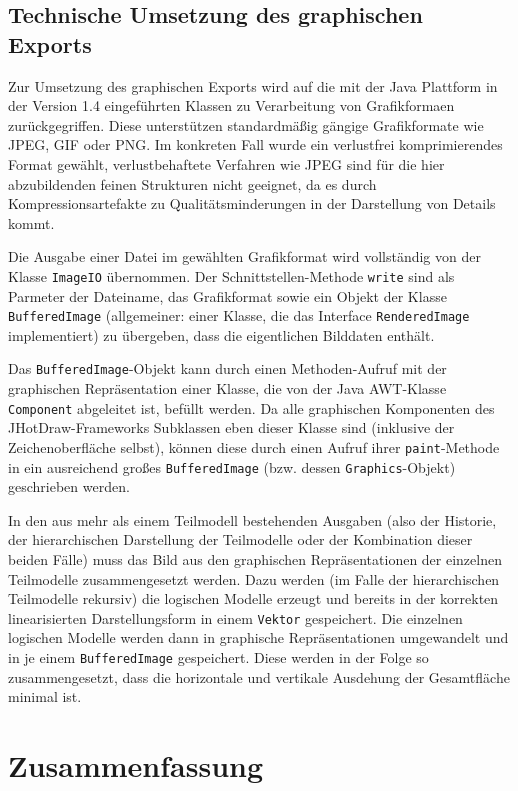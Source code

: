 
\subsection{Technische Umsetzung des graphischen Exports} %
\label{sub:technische_umsetzung_des_graphischen_exports}

Zur Umsetzung des graphischen Exports wird auf die mit der Java Plattform in der Version 1.4 eingeführten Klassen zu Verarbeitung von Grafikformaen zurückgegriffen. Diese unterstützen standardmäßig gängige Grafikformate wie \gls{JPEG}, \gls{GIF} oder \gls{PNG}. Im konkreten Fall wurde ein verlustfrei komprimierendes Format gewählt, verlustbehaftete Verfahren wie \gls{JPEG} sind für die hier abzubildenden feinen Strukturen nicht geeignet, da es durch Kompressionsartefakte zu Qualitätsminderungen in der Darstellung von Details kommt.

Die Ausgabe einer Datei im gewählten Grafikformat wird vollständig von der Klasse \texttt{ImageIO} übernommen. Der Schnittstellen-Methode \texttt{write} sind als Parmeter der Dateiname, das Grafikformat sowie ein Objekt der Klasse \texttt{BufferedImage} (allgemeiner: einer Klasse, die das Interface \texttt{RenderedImage} implementiert) zu übergeben, dass die eigentlichen Bilddaten enthält.

Das \texttt{BufferedImage}-Objekt kann durch einen Methoden-Aufruf mit der graphischen Repräsentation einer Klasse, die von der Java \gls{AWT}-Klasse \texttt{Component} abgeleitet ist, befüllt werden. Da alle graphischen Komponenten des JHotDraw-Frameworks Subklassen eben dieser Klasse sind (inklusive der Zeichenoberfläche selbst), können diese durch einen Aufruf ihrer \texttt{paint}-Methode in ein ausreichend großes \texttt{BufferedImage} (bzw. dessen \texttt{Graphics}-Objekt) geschrieben werden.  

In den aus mehr als einem Teilmodell bestehenden Ausgaben (also der Historie, der hierarchischen Darstellung der Teilmodelle oder der Kombination dieser beiden Fälle) muss das Bild aus den graphischen Repräsentationen der einzelnen Teilmodelle zusammengesetzt werden. Dazu werden (im Falle der hierarchischen Teilmodelle rekursiv) die logischen Modelle erzeugt und bereits in der korrekten linearisierten Darstellungsform in einem \texttt{Vektor} gespeichert. Die einzelnen logischen Modelle werden dann in graphische Repräsentationen umgewandelt und in je einem \texttt{BufferedImage} gespeichert. Diese werden in der Folge so zusammengesetzt, dass die horizontale und vertikale Ausdehung der Gesamtfläche minimal ist.


\section{Zusammenfassung} %
\label{sec:persistierung_zusammenfassung}


